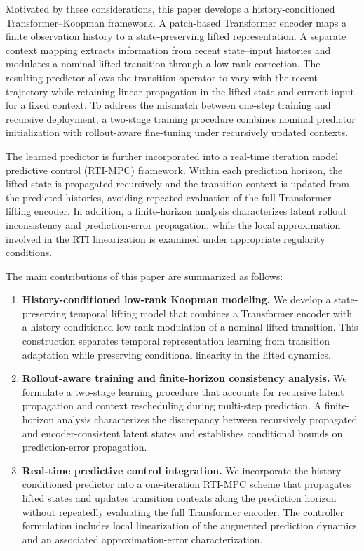\documentclass[journal]{IEEEtran}
\begin{document}
Motivated by these considerations, this paper develops a history-conditioned Transformer--Koopman framework. A patch-based Transformer encoder maps a finite observation history to a state-preserving lifted representation. A separate context mapping extracts information from recent state--input histories and modulates a nominal lifted transition through a low-rank correction. The resulting predictor allows the transition operator to vary with the recent trajectory while retaining linear propagation in the lifted state and current input for a fixed context. To address the mismatch between one-step training and recursive deployment, a two-stage training procedure combines nominal predictor initialization with rollout-aware fine-tuning under recursively updated contexts.

The learned predictor is further incorporated into a real-time iteration model predictive control (RTI-MPC) framework. Within each prediction horizon, the lifted state is propagated recursively and the transition context is updated from the predicted histories, avoiding repeated evaluation of the full Transformer lifting encoder. In addition, a finite-horizon analysis characterizes latent rollout inconsistency and prediction-error propagation, while the local approximation involved in the RTI linearization is examined under appropriate regularity conditions.

The main contributions of this paper are summarized as follows:
\begin{enumerate}
    \item \textbf{History-conditioned low-rank Koopman modeling.}
    We develop a state-preserving temporal lifting model that combines a Transformer encoder with a history-conditioned low-rank modulation of a nominal lifted transition. This construction separates temporal representation learning from transition adaptation while preserving conditional linearity in the lifted dynamics.

    \item \textbf{Rollout-aware training and finite-horizon consistency analysis.}
    We formulate a two-stage learning procedure that accounts for recursive latent propagation and context rescheduling during multi-step prediction. A finite-horizon analysis characterizes the discrepancy between recursively propagated and encoder-consistent latent states and establishes conditional bounds on prediction-error propagation.

    \item \textbf{Real-time predictive control integration.}
    We incorporate the history-conditioned predictor into a one-iteration RTI-MPC scheme that propagates lifted states and updates transition contexts along the prediction horizon without repeatedly evaluating the full Transformer encoder. The controller formulation includes local linearization of the augmented prediction dynamics and an associated approximation-error characterization.
\end{enumerate}
\end{document}
